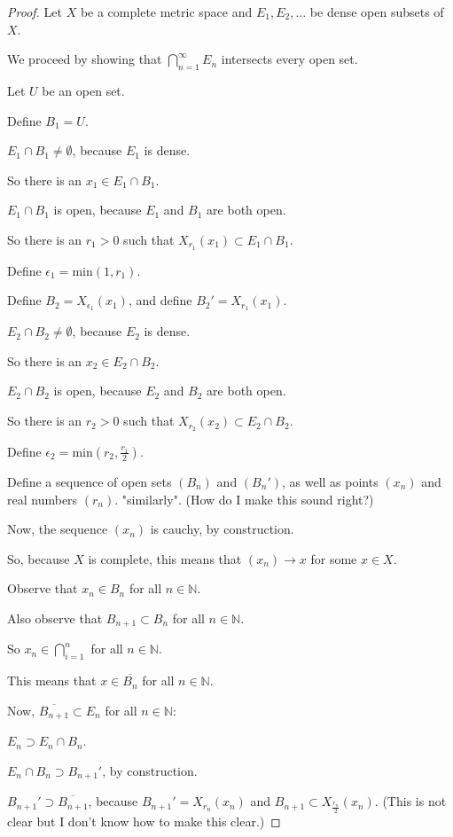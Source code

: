 \documentclass{amsart}
\newcommand{\tab}{\hspace{4mm}} %
\newcommand{\ep}{\epsilon}
\newcommand{\N}{\mathbb{N}}
\theoremstyle{definition}
\begin{document}
\begin{proof}
Let $X$ be a complete metric space and $E_1, E_2, \ldots$ be dense open subsets of $X$.

We proceed by showing that $\bigcap\limits_{n = 1}^{\infty} E_n$ intersects every open set.

Let $U$ be an open set.

Define $B_1 = U$.

$E_1 \cap B_1 \neq \emptyset$, because $E_1$ is dense.

So there is an $x_1 \in E_1 \cap B_1$.

$E_1 \cap B_1$ is open, because $E_1$ and $B_1$ are both open.

So there is an $r_1 >0$ such that $X_{r_1}(x_1) \subset E_1 \cap B_1$.

Define $\ep_1 = $min$(1, r_1)$.

Define $B_2 = X_{\ep_1}(x_1)$, and define $B_2'= X_{r_1}(x_1)$.

$E_2 \cap B_2 \neq \emptyset$, because $E_2$ is dense.

So there is an $x_2 \in E_2 \cap B_2$.

$E_2 \cap B_2$ is open, because $E_2$ and $B_2$ are both open.

So there is an $r_2 >0$ such that $X_{r_2}(x_2) \subset E_2 \cap B_2$.

Define $\ep_2 = $min$(r_2, \frac{r_1}{2})$.

Define a sequence of open sets $(B_n)$ and $(B_n')$, as well as points $(x_n)$ and real numbers $(r_n)$. "similarly". (How do I make this sound right?)

Now, the sequence $(x_n)$ is cauchy, by construction.

So, because $X$ is complete, this means that $(x_n) \to x$ for some $x \in X$.

Observe that $x_n \in B_n$ for all $n \in \N$.

Also observe that $B_{n+1} \subset B_n$ for all $n \in \N$.

So $x_n \in \bigcap\limits_{i =1}^n$ for all $n \in \N$.

This means that $x \in \overline{B_n}$ for all $n \in \N$.

Now, $\overline{B_{n+1}} \subset E_n$ for all $n \in \N$:

\tab $E_n \supset E_n \cap B_n$.

\tab $E_n \cap B_n \supset B_{n+1}'$, by construction.

\tab $B_{n+1}' \supset \overline{B_{n+1}}$, because $B_{n+1}'=X_{r_n}(x_n)$ and $B_{n+1} \subset X_{\frac{r_n}{2}}(x_n)$. (This is not clear but I don't know how to make this clear.) 


\end{proof}
\end{document}
